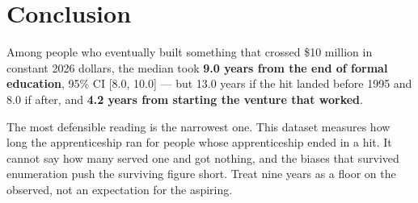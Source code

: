 \documentclass[11pt]{article}
\begin{document}
\section{Conclusion}

Among people who eventually built something that crossed \$10 million in
constant 2026 dollars, the median took \textbf{9.0 years from the end of formal
education}, 95\% CI [8.0, 10.0] --- but 13.0 years if the hit landed before
1995 and 8.0 if after, and \textbf{4.2 years from starting the venture that
worked}.

The most defensible reading is the narrowest one. This dataset measures how long
the apprenticeship ran for people whose apprenticeship ended in a hit. It cannot
say how many served one and got nothing, and the biases that survived
enumeration push the surviving figure short. Treat nine years as a floor on the
observed, not an expectation for the aspiring.
\end{document}
